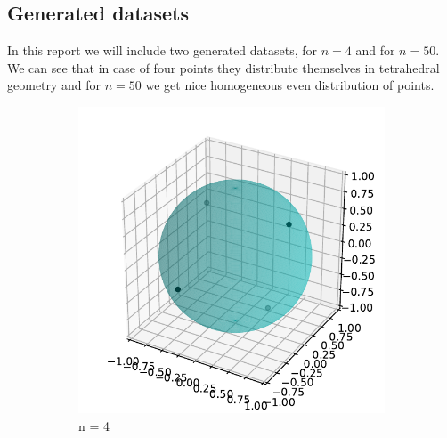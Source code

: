\documentclass[a4paper, 12pt]{article}
\begin{document}
\subsection{Generated datasets}

In this report we will include two generated datasets, for $n = 4$ and for $n = 50$. We can see that in case of four points they distribute themselves in tetrahedral geometry and for $n = 50$ we get nice homogeneous even distribution of points.

\begin{figure}[!ht]
	\centering
	\begin{subfigure}{.5\textwidth}
		\centering
		\includegraphics[scale=0.75]{../images/generated2.pdf}
		\caption{n = 4}
	\end{subfigure}%
	\begin{subfigure}{.5\textwidth}
		\centering

\end{subfigure}
\end{figure}
\end{document}
